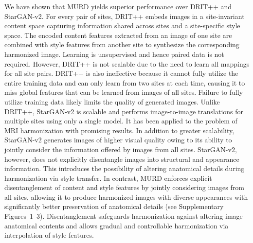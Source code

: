 \documentclass{nature}
\newcommand{\rev}[1]{\textcolor{red}{#1}}
\begin{document}
We have shown that MURD yields superior performance over DRIT++\cite{Lee2020DRIT} and StarGAN-v2\cite{Choi2020StarGANv2}.
For every pair of sites, DRIT++ embeds images in a site-invariant content space capturing information shared across sites and a site-specific style space. The encoded content features extracted from an image of one site are combined with style features from another site to synthesize the corresponding harmonized image. Learning is unsupervised and hence paired data is not required. However, DRIT++ is not scalable due to the need to learn all mappings for all site pairs.
DRIT++ is also ineffective because it cannot fully utilize the entire training data and can only learn from two sites at each time, causing it to miss global features that can be learned from images of all sites. 
Failure to fully utilize training data likely limits the quality of generated images. 
%
Unlike DRIT++, StarGAN-v2\cite{Choi2020StarGANv2} is scalable and performs image-to-image translations for multiple sites using only a single model. It has been applied to the problem of MRI harmonization\cite{Liu2021Style} with promising results.
In addition to greater scalability, StarGAN-v2 generates images of higher visual quality owing to its ability to jointly consider the information offered by images from all sites.  
StarGAN-v2, however, does not explicitly disentangle images into structural and appearance information. This introduces the possibility of altering anatomical details during harmonization via style transfer.
In contrast,  MURD enforces explicit disentanglement of  content and style features by jointly considering images from all sites, allowing it to produce harmonized images with diverse appearances with significantly better preservation of anatomical details (see Supplementary Figures~1--3).
Disentanglement safeguards harmonization against altering image anatomical contents and allows gradual and controllable harmonization via interpolation of style features. 
\end{document}
